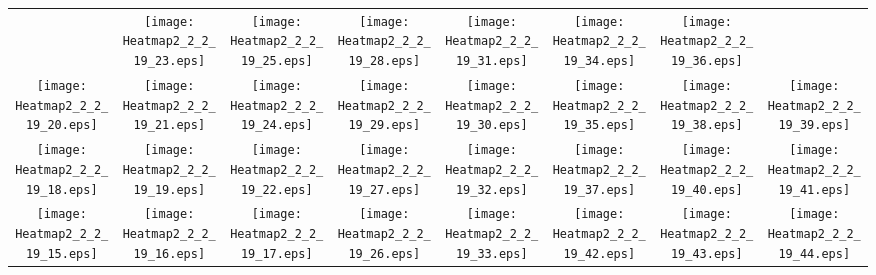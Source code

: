 \documentclass{standalone}
\begin{document}
\renewcommand{\arraystretch}{0}
\setlength{\tabcolsep}{0pt}
\begin{tabular}{ *8{c} }
 & \texttt{[image: Heatmap2\_2\_2\_19\_23.eps]} & \texttt{[image: Heatmap2\_2\_2\_19\_25.eps]} & \texttt{[image: Heatmap2\_2\_2\_19\_28.eps]} & \texttt{[image: Heatmap2\_2\_2\_19\_31.eps]} & \texttt{[image: Heatmap2\_2\_2\_19\_34.eps]} & \texttt{[image: Heatmap2\_2\_2\_19\_36.eps]} &  \\
\texttt{[image: Heatmap2\_2\_2\_19\_20.eps]} & \texttt{[image: Heatmap2\_2\_2\_19\_21.eps]} & \texttt{[image: Heatmap2\_2\_2\_19\_24.eps]} & \texttt{[image: Heatmap2\_2\_2\_19\_29.eps]} & \texttt{[image: Heatmap2\_2\_2\_19\_30.eps]} & \texttt{[image: Heatmap2\_2\_2\_19\_35.eps]} & \texttt{[image: Heatmap2\_2\_2\_19\_38.eps]} & \texttt{[image: Heatmap2\_2\_2\_19\_39.eps]} \\
\texttt{[image: Heatmap2\_2\_2\_19\_18.eps]} & \texttt{[image: Heatmap2\_2\_2\_19\_19.eps]} & \texttt{[image: Heatmap2\_2\_2\_19\_22.eps]} & \texttt{[image: Heatmap2\_2\_2\_19\_27.eps]} & \texttt{[image: Heatmap2\_2\_2\_19\_32.eps]} & \texttt{[image: Heatmap2\_2\_2\_19\_37.eps]} & \texttt{[image: Heatmap2\_2\_2\_19\_40.eps]} & \texttt{[image: Heatmap2\_2\_2\_19\_41.eps]} \\
\texttt{[image: Heatmap2\_2\_2\_19\_15.eps]} & \texttt{[image: Heatmap2\_2\_2\_19\_16.eps]} & \texttt{[image: Heatmap2\_2\_2\_19\_17.eps]} & \texttt{[image: Heatmap2\_2\_2\_19\_26.eps]} & \texttt{[image: Heatmap2\_2\_2\_19\_33.eps]} & \texttt{[image: Heatmap2\_2\_2\_19\_42.eps]} & \texttt{[image: Heatmap2\_2\_2\_19\_43.eps]} & \texttt{[image: Heatmap2\_2\_2\_19\_44.eps]} \\

\end{tabular}
\end{document}
